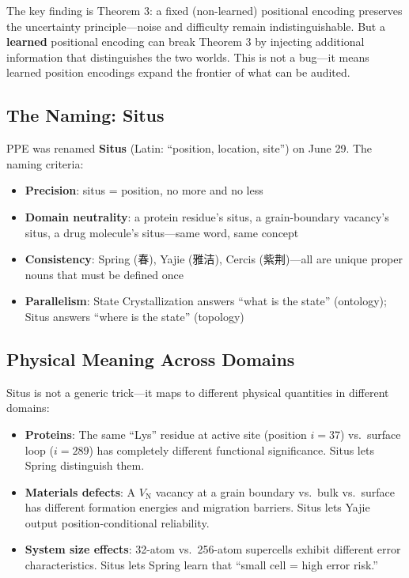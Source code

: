 \documentclass[12pt,a4paper]{ctexart}
\begin{document}
The key finding is Theorem 3: a fixed (non-learned) positional encoding preserves the uncertainty principle—noise and difficulty remain indistinguishable. But a \textbf{learned} positional encoding can break Theorem 3 by injecting additional information that distinguishes the two worlds. This is not a bug—it means learned position encodings expand the frontier of what can be audited.

\subsection{The Naming: Situs}

PPE was renamed \textbf{Situs} (Latin: ``position, location, site'') on June 29. The naming criteria:
\begin{itemize}
\item \textbf{Precision}: situs = position, no more and no less
\item \textbf{Domain neutrality}: a protein residue's situs, a grain-boundary vacancy's situs, a drug molecule's situs—same word, same concept
\item \textbf{Consistency}: Spring (春), Yajie (雅洁), Cercis (紫荆)—all are unique proper nouns that must be defined once
\item \textbf{Parallelism}: State Crystallization answers ``what is the state'' (ontology); Situs answers ``where is the state'' (topology)
\end{itemize}

\subsection{Physical Meaning Across Domains}

Situs is not a generic trick—it maps to different physical quantities in different domains:
\begin{itemize}
\item \textbf{Proteins}: The same ``Lys'' residue at active site (position $i=37$) vs.\ surface loop ($i=289$) has completely different functional significance. Situs lets Spring distinguish them.
\item \textbf{Materials defects}: A $V_{\text{N}}$ vacancy at a grain boundary vs.\ bulk vs.\ surface has different formation energies and migration barriers. Situs lets Yajie output position-conditional reliability.
\item \textbf{System size effects}: 32-atom vs.\ 256-atom supercells exhibit different error characteristics. Situs lets Spring learn that ``small cell = high error risk.''
\end{itemize}
\end{document}
